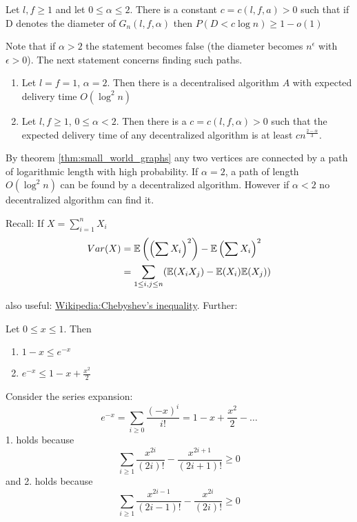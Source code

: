 \begin{thm}\label{thm:small_world_graphs} Let $l,f\geq 1$ and let $0\leq \alpha \leq 2$. There is a constant $c=c(l,f,a) > 0$ such that if D denotes the diameter of $G_n(l,f,\alpha)$ then $P(D<c\log n) \geq 1-o(1)$
\end{thm}

Note that if $\alpha > 2$ the statement becomes false (the diameter becomes $n^\epsilon$ with $\epsilon > 0$). The next statement concerns finding such paths.

\begin{thm}\label{thm:finding_short_paths} \mbox{}\begin{enumerate}
\item Let $l=f=1$, $\alpha =2$. Then there is a decentralised algorithm $A$ with expected delivery time $O(\log^2n)$
\item Let $l,f\geq 1$, $0 \leq \alpha < 2$. Then there is a $c=c(l,f,\alpha)>0$ such that the expected delivery time of any decentralized algorithm is at least $c n^{\frac{2-\alpha}{3}}$.
\end{enumerate}
\end{thm}

By theorem \ref{thm:small_world_graphs} any two vertices are connected by a path of logarithmic length with high probability. If $\alpha=2$, a path of length $O(\log ^2 n)$ can be found by a decentralized algorithm. However if $\alpha <2$ no decentralized algorithm can find it.

Recall: If $X = \sum_{i=1}^n X_i$
\begin{align*}
Var(X) &= \mathbb{E}\left(\left(\sum X_i\right)^2\right) - \mathbb{E}\left(\sum X_i\right)^2\\
	&= \sum_{1\leq i, j\leq n} (\mathbb{E}(X_iX_j) - \mathbb{E}(X_i)\mathbb{E}(X_j))
\end{align*}

also useful: \href{http://en.wikipedia.org/wiki/Chebyshev\%27s_inequality}{Wikipedia:Chebyshev's inequality}. Further:

\begin{lem} Let $0\leq x \leq 1$. Then
\begin{enumerate}
\item $1-x\leq e^{-x}$
\item $e^{-x} \leq 1-x+\frac{x^2}{2}$
\end{enumerate}
\end{lem}
\begin{pr} Consider the series expansion:
\[e^{-x} = \sum_{i\geq 0} \frac{(-x)^i}{i!} = 1-x+\frac{x^2}{2} - \ldots\]
1. holds because 
\[\sum_{i\geq 1} \frac{x^{2i}}{(2i)!} - \frac{x^{2i+1}}{(2i+1)!} \geq 0\]
and 2. holds because
\[\sum_{i\geq 1} \frac{x^{2i-1}}{(2i-1)!} - \frac{x^{2i}}{(2i)!} \geq 0\]
\end{pr}

